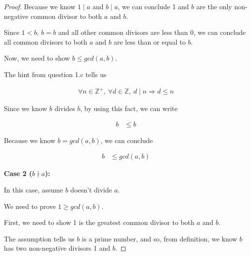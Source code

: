 \documentclass[12pt]{article}
\begin{document}
\begin{enumerate}[a.]
\begin{proof}
        \bigskip

        Because we know $1 \mid a$ and $b \mid a$, we can conclude 1 and
        $b$ are the only non-negative common divisor to both $a$ and $b$.

        \bigskip

        Since $1 < b$, $b = b$ and all other common divisors are less than 0,
        we can conclude all common divisors to both $a$ and $b$ are less than or equal to $b$.

        \bigskip

        Now, we need to show $b \leq gcd(a,b)$.

        \bigskip

        The hint from question 1.c tells us

        \setcounter{equation}{0}
        \begin{align}
            \forall n \in \mathbb{Z}^{+},\:\forall d \in \mathbb{Z},\:d \mid n \Rightarrow d \leq n
        \end{align}

        Since we know $b$ divides $b$, by using this fact, we can write

        \begin{align}
            b &\leq b
        \end{align}

        Because we know $b = gcd(a,b)$, we can conclude

        \begin{align}
            b &\leq gcd(a,b)
        \end{align}

        \bigskip

        \textbf{Case 2 ($b \nmid a$):}

        \bigskip

        In this case, assume $b$ doesn't divide $a$.

        \bigskip

        We need to prove $1 \geq gcd(a,b)$.

        \bigskip

        First, we need to show 1 is the greatest common divisor to both $a$
        and $b$.

        \bigskip

        The assumption tells us $b$ is a prime number, and so, from definition,
        we know $b$ has two non-negative divisors 1 and $b$.

        \bigskip


\end{proof}
\end{enumerate}
\end{document}
